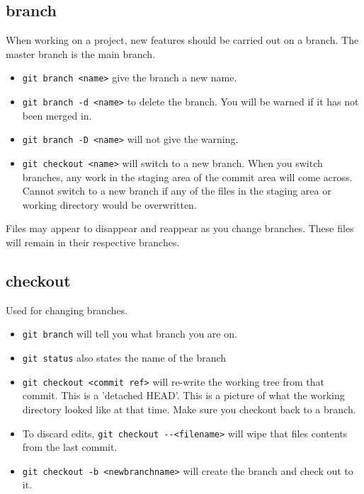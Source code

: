 \documentclass[11pt]{article} %
\begin{document}
\subsection*{branch}
When working on a project, new features should be carried out on a branch. The master branch is the main branch.  
\begin{itemize}
\item \lstinline{git branch <name>} give the branch a new name. 
\item \lstinline{git branch -d <name>} to delete the branch.  You will be warned if it has not been merged in. 
\item \lstinline{git branch -D <name>} will not give the warning. 
\item \lstinline{git checkout <name>} will switch to a new branch. When you switch branches, any work in the staging area of the commit area will come across. Cannot switch to a new branch if any of the files in the staging area or working directory would be overwritten.  
\end{itemize}
Files may appear to disappear and reappear as you change branches.  These files will remain in their respective branches. 

\subsection{checkout}
Used for changing branches. 
\begin{itemize}
\item \lstinline{git branch} will tell you what branch you are on.
\item \lstinline{git status} also states the name of the branch
\item \lstinline{git checkout <commit ref>} will re-write the working tree from that commit. This is a 'detached HEAD'. This is a picture of what the working directory looked like at that time. Make sure you checkout back to a branch. 
\item To discard edits, \lstinline{git checkout --<filename>} will wipe that files contents from the last commit. 
\item \lstinline{git checkout -b <newbranchname>} will create the branch and check out to it.
\end{itemize}
\end{document}
